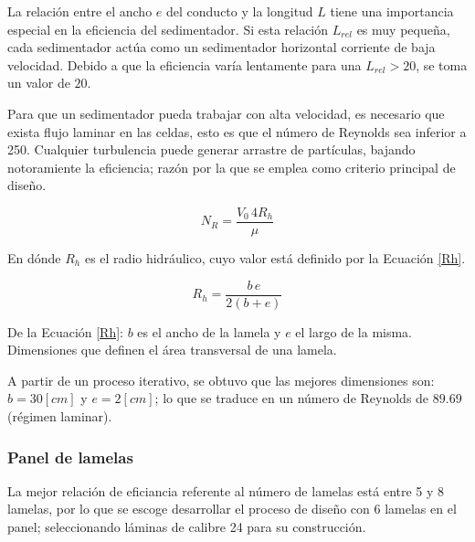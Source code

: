 \noindent
\justify

La relaci\'on entre el ancho $e$ del conducto y la longitud $L$ tiene una importancia especial en la eficiencia del sedimentador. Si esta relaci\'on $L_{rel}$ es muy peque\~na, cada sedimentador act\'ua como un sedimentador horizontal corriente de baja velocidad. Debido a que la eficiencia var\'ia lentamente para una $L_{rel} > 20$, se toma un valor de $20$.

\noindent
\justify

Para que un sedimentador pueda trabajar con alta velocidad, es necesario que exista flujo laminar en las celdas, esto es que el n\'umero de Reynolds sea inferior a 250. Cualquier turbulencia puede generar arrastre de part\'iculas, bajando notoramiente la eficiencia; raz\'on por la que se emplea como criterio principal de dise\~no. 

\begin{equation}
	N_R = \frac{V_0 \, 4 R_h}{\mu}
	\label{Reynolds}
\end{equation}

\noindent
\justify

En d\'onde $R_h$ es el radio hidr\'aulico, cuyo valor est\'a definido por la Ecuaci\'on \ref{Rh}.

\begin{equation}
	R_h = \frac{b \, e}{2(b+e)}
	\label{Rh}
\end{equation}

\noindent
\justify

De la Ecuaci\'on \ref{Rh}: $b$ es el ancho de la lamela y $e$ el largo de la misma. Dimensiones que definen el \'area transversal de una lamela. 

\noindent
\justify

A partir de un proceso iterativo, se obtuvo que las mejores dimensiones son: $b = 30 [cm]$ y $e = 2 [cm]$; lo que se traduce en un n\'umero de Reynolds de $89.69$ (r\'egimen laminar).

\subsubsection{Panel de lamelas}

\noindent
\justify

La mejor relaci\'on de eficiancia referente al n\'umero de lamelas est\'a entre 5 y 8 lamelas, por lo que se escoge desarrollar el proceso de dise\~no con 6 lamelas en el panel; seleccionando l\'aminas de calibre 24 para su construcci\'on.

